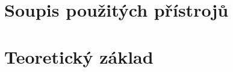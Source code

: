 \documentclass{article}
\begin{document}
\section{Soupis použitých přístrojů}



\section{Teoretický základ}
\end{document}
